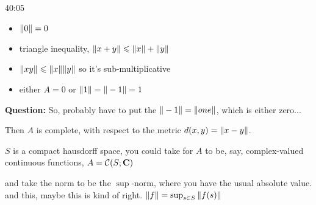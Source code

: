 \begin{example}
\begin{unfinished}{40:05}
\begin{itemize}
\item $\| 0 \| = 0$
\item triangle inequality, $\| x + y \| \leqslant \| x \| + \| y \|$
\item $\| xy \| \leqslant \| x \| \| y \|$ so it's sub-multiplicative
\item either $A = 0$ or $\| 1 \| = \| -1 \| = 1$
\end{itemize}

\textbf{Question:} So, probably have to put the $\| -1 \| = \| one \|$, which is either zero...


Then $A$ is complete, with respect to the metric $d(x,y) = \| x-y \|$. 

\begin{example} \label{ex:22-banach-ring}
$S$ is a compact hausdorff space, you could take for $A$ to be, say, complex-valued continuous functions,
$A = \mathcal{C}(S; \mathbf C)$

and take the norm to be the $\sup$-norm, where you have the usual absolute value. 
and this, maybe this is kind of right. 
$\| f \| = \sup_{s \in S} \| f(s) \|$

\end{example}
 
\end{unfinished}
\end{example}
